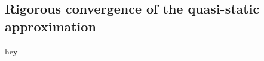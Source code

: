 \documentclass[12pt]{article}
\begin{document}
%


\subsection{Rigorous convergence of the quasi-static approximation}

hey


\nocite{*}
\printbibliography
\end{document}
